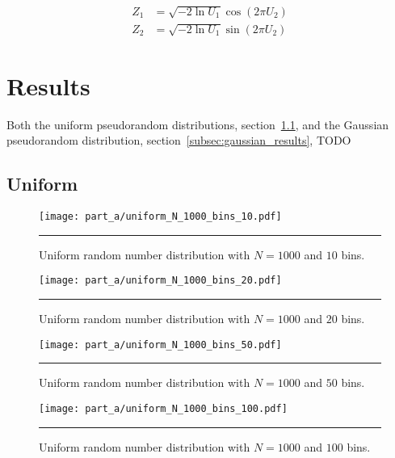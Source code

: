 \documentclass[notitlepage,aps,prd,nofootinbib]{revtex4-1}
\begin{document}
\begin{equation} \label{eq:Zs}
\begin{aligned}
Z_{1} &= \sqrt{-2\ln U_{1}} \cos\left(2\pi U_{2}\right) \\
Z_{2} &= \sqrt{-2\ln U_{1}} \sin\left(2\pi U_{2}\right)
\end{aligned}
\end{equation}

\section{Results}
\label{sec:results}
Both the uniform pseudorandom distributions, section~\ref{subsec:uniform_results}, and the Gaussian pseudorandom distribution, section~\ref{subsec:gaussian_results},  
TODO


\clearpage
\subsection{Uniform}
\label{subsec:uniform_results}

\begin{figure}[!htbc]
  \centering
  \texttt{[image: part\_a/uniform\_N\_1000\_bins\_10.pdf]}
	{\par\nobreak\rule[9pt]{35em}{0.5pt}\vspace{-5mm}}
	\caption{Uniform random number distribution with $N = 1000$ and $10$ bins.}
	\label{fig:uniform_N_1000_bins_10}
\end{figure}

\begin{figure}[!htbc]
  \centering
  \texttt{[image: part\_a/uniform\_N\_1000\_bins\_20.pdf]}
	{\par\nobreak\rule[9pt]{35em}{0.5pt}\vspace{-5mm}}
	\caption{Uniform random number distribution with $N = 1000$ and $20$ bins.}
	\label{fig:uniform_N_1000_bins_20}
\end{figure}

\begin{figure}[!htbc]
  \centering
  \texttt{[image: part\_a/uniform\_N\_1000\_bins\_50.pdf]}
	{\par\nobreak\rule[9pt]{35em}{0.5pt}\vspace{-5mm}}
	\caption{Uniform random number distribution with $N = 1000$ and $50$ bins.}
	\label{fig:uniform_N_1000_bins_50}
\end{figure}

\begin{figure}[!htbc]
  \centering
  \texttt{[image: part\_a/uniform\_N\_1000\_bins\_100.pdf]}
	{\par\nobreak\rule[9pt]{35em}{0.5pt}\vspace{-5mm}}
	\caption{Uniform random number distribution with $N = 1000$ and $100$ bins.}
	\label{fig:uniform_N_1000_bins_100}
\end{figure}
\end{document}
